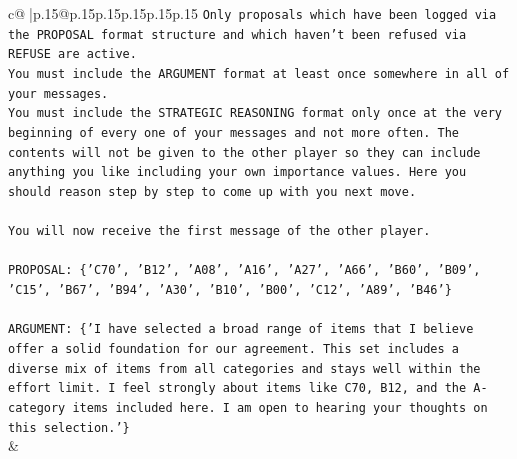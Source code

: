 \documentclass{article}
\begin{document}
{\begin{supertabular}{c@{$\;$}|p{.15\linewidth}@{}p{.15\linewidth}p{.15\linewidth}p{.15\linewidth}p{.15\linewidth}p{.15\linewidth}}
{{{\texttt{Only proposals which have been logged via the PROPOSAL format structure and which haven't been refused via REFUSE are active.} \\
\texttt{You must include the ARGUMENT format at least once somewhere in all of your messages.} \\
\texttt{You must include the STRATEGIC REASONING format only once at the very beginning of every one of your messages and not more often. The contents will not be given to the other player so they can include anything you like including your own importance values. Here you should reason step by step to come up with you next move.} \\
\\ 
\texttt{You will now receive the first message of the other player.} \\
\\ 
\texttt{PROPOSAL: \{'C70', 'B12', 'A08', 'A16', 'A27', 'A66', 'B60', 'B09', 'C15', 'B67', 'B94', 'A30', 'B10', 'B00', 'C12', 'A89', 'B46'\}} \\
\\ 
\texttt{ARGUMENT: \{'I have selected a broad range of items that I believe offer a solid foundation for our agreement. This set includes a diverse mix of items from all categories and stays well within the effort limit. I feel strongly about items like C70, B12, and the A{-}category items included here. I am open to hearing your thoughts on this selection.'\}} \\
            }
        }
    }
    & \\ \\


\end{supertabular}}
\end{document}

